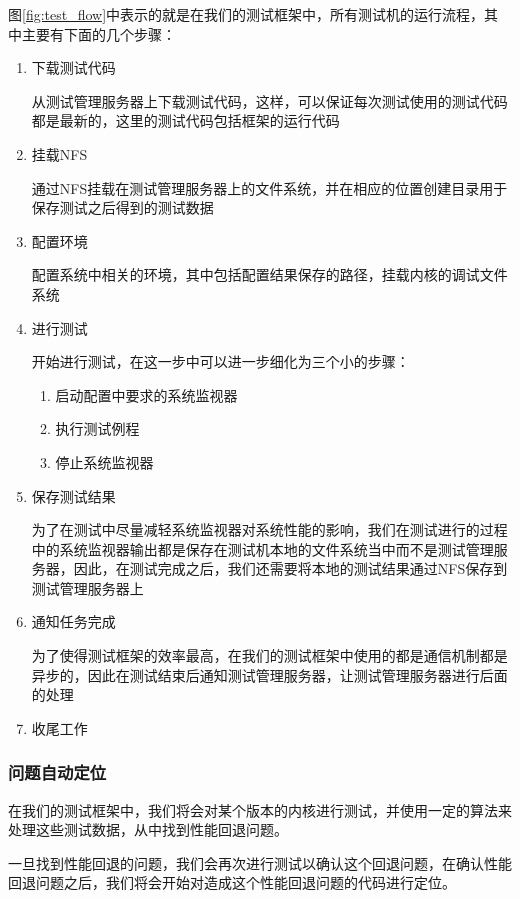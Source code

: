 图\ref{fig:test_flow}中表示的就是在我们的测试框架中，所有测试机的运行流程，其中主要有下面的几个步骤：
\begin{enumerate}
\item 下载测试代码

从测试管理服务器上下载测试代码，这样，可以保证每次测试使用的测试代码都是最新的，这里的测试代码包括框架的运行代码

\item 挂载NFS

通过NFS挂载在测试管理服务器上的文件系统，并在相应的位置创建目录用于保存测试之后得到的测试数据

\item 配置环境

配置系统中相关的环境，其中包括配置结果保存的路径，挂载内核的调试文件系统


\item 进行测试

开始进行测试，在这一步中可以进一步细化为三个小的步骤：
\begin{enumerate}
\item 启动配置中要求的系统监视器
\item 执行测试例程
\item 停止系统监视器
\end{enumerate}

\item 保存测试结果

为了在测试中尽量减轻系统监视器对系统性能的影响，我们在测试进行的过程中的系统监视器输出都是保存在测试机本地的文件系统当中而不是测试管理服务器，因此，在测试完成之后，我们还需要将本地的测试结果通过NFS保存到测试管理服务器上

\item 通知任务完成

为了使得测试框架的效率最高，在我们的测试框架中使用的都是通信机制都是异步的，因此在测试结束后通知测试管理服务器，让测试管理服务器进行后面的处理
\item 收尾工作
\end{enumerate}


\subsubsection{问题自动定位}
在我们的测试框架中，我们将会对某个版本的内核进行测试，并使用一定的算法来处理这些测试数据，从中找到性能回退问题。

一旦找到性能回退的问题，我们会再次进行测试以确认这个回退问题，在确认性能回退问题之后，我们将会开始对造成这个性能回退问题的代码进行定位。

